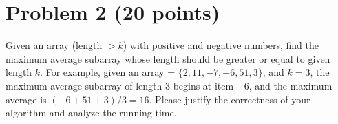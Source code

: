 \documentclass[letterpaper, 11pt]{article}
\begin{document}
\section{Problem 2 (20 points) }
Given an array (length $> k$) with positive and negative numbers, find the maximum average subarray whose length should be greater or equal to given length $k$. For example, given an array = $\{2, 11, -7, -6, 51, 3\}$, and $k = 3$, the maximum average subarray of length 3 begins at item $-6$,
and the maximum average is $(- 6 + 51+3)/3 = 16$. Please justify the correctness of your algorithm and analyze the running time.
\end{document}
